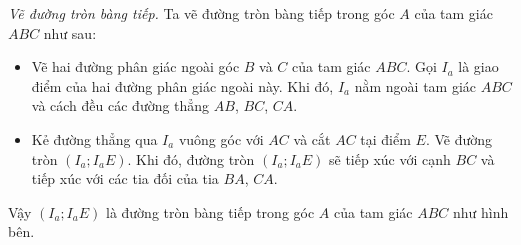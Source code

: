 \begin{lesson}
    \textit{Vẽ đường tròn bàng tiếp.} Ta vẽ đường tròn bàng tiếp trong góc $A$ của tam giác $ABC$ như sau:
    \begin{itemize}
        \item Vẽ hai đường phân giác ngoài góc $B$ và $C$ của tam giác $ABC$. Gọi $I_a$ là giao điểm của hai đường phân giác ngoài này. Khi đó, $I_a$ nằm ngoài tam giác $ABC$ và cách đều các đường thẳng $AB$, $BC$, $CA$.
        \item Kẻ đường thẳng qua $I_a$ vuông góc với $AC$ và cắt $AC$ tại điểm $E$. Vẽ đường tròn $(I_a;I_aE)$. Khi đó, đường tròn $(I_a;I_aE)$ sẽ tiếp xúc với cạnh $BC$ và tiếp xúc với các tia đối của tia $BA$, $CA$.
    \end{itemize}

    Vậy $(I_a;I_aE)$ là đường tròn bàng tiếp trong góc $A$ của tam giác $ABC$ như hình bên.

    \begin{center}
    \end{center}
\end{lesson}

